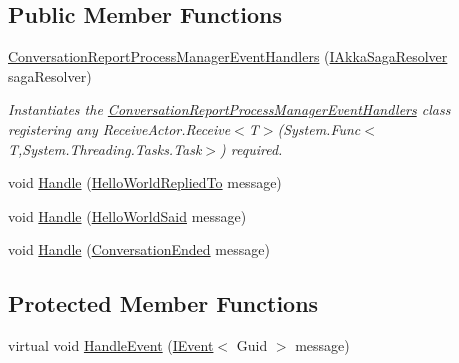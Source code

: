 \subsection*{Public Member Functions}
\begin{DoxyCompactItemize}
\item 
\hyperlink{classCqrs_1_1Akka_1_1Tests_1_1Unit_1_1Sagas_1_1ConversationReportProcessManagerEventHandlers_a0b35d652189d6194ff5893ff114293e0_a0b35d652189d6194ff5893ff114293e0}{Conversation\+Report\+Process\+Manager\+Event\+Handlers} (\hyperlink{interfaceCqrs_1_1Akka_1_1Domain_1_1IAkkaSagaResolver}{I\+Akka\+Saga\+Resolver} saga\+Resolver)
\begin{DoxyCompactList}\small\item\em Instantiates the \hyperlink{classCqrs_1_1Akka_1_1Tests_1_1Unit_1_1Sagas_1_1ConversationReportProcessManagerEventHandlers}{Conversation\+Report\+Process\+Manager\+Event\+Handlers} class registering any Receive\+Actor.\+Receive$<$\+T$>$(\+System.\+Func$<$\+T,\+System.\+Threading.\+Tasks.\+Task$>$) required. \end{DoxyCompactList}\item 
void \hyperlink{classCqrs_1_1Akka_1_1Tests_1_1Unit_1_1Sagas_1_1ConversationReportProcessManagerEventHandlers_a0a40389673be0983b56d65eeaa54bff9_a0a40389673be0983b56d65eeaa54bff9}{Handle} (\hyperlink{classCqrs_1_1Akka_1_1Tests_1_1Unit_1_1Events_1_1HelloWorldRepliedTo}{Hello\+World\+Replied\+To} message)
\item 
void \hyperlink{classCqrs_1_1Akka_1_1Tests_1_1Unit_1_1Sagas_1_1ConversationReportProcessManagerEventHandlers_a2dab5ed936f713ae25786ab905103f59_a2dab5ed936f713ae25786ab905103f59}{Handle} (\hyperlink{classCqrs_1_1Akka_1_1Tests_1_1Unit_1_1Events_1_1HelloWorldSaid}{Hello\+World\+Said} message)
\item 
void \hyperlink{classCqrs_1_1Akka_1_1Tests_1_1Unit_1_1Sagas_1_1ConversationReportProcessManagerEventHandlers_a8d31b621db17f2beba78e98a0040f384_a8d31b621db17f2beba78e98a0040f384}{Handle} (\hyperlink{classCqrs_1_1Akka_1_1Tests_1_1Unit_1_1Events_1_1ConversationEnded}{Conversation\+Ended} message)
\end{DoxyCompactItemize}
\subsection*{Protected Member Functions}
\begin{DoxyCompactItemize}
\item 
virtual void \hyperlink{classCqrs_1_1Akka_1_1Tests_1_1Unit_1_1Sagas_1_1ConversationReportProcessManagerEventHandlers_a51207786638b00eaae1cae24d0053822_a51207786638b00eaae1cae24d0053822}{Handle\+Event} (\hyperlink{interfaceCqrs_1_1Events_1_1IEvent}{I\+Event}$<$ Guid $>$ message)
\end{DoxyCompactItemize}
